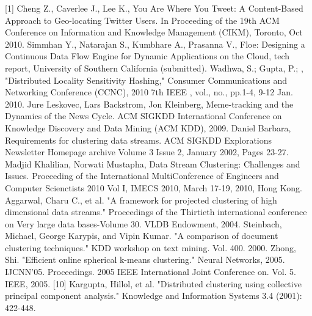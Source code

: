 \documentclass{article} %
\begin{document}
\small{

[1] 	Cheng Z., Caverlee J., Lee K., You Are Where You Tweet: A Content-Based Approach to Geo-locating Twitter Users. In Proceeding of the 19th ACM Conference on Information and Knowledge Management (CIKM), Toronto, Oct 2010. \newline
[2] Simmhan Y., Natarajan S., Kumbhare A., Prasanna V., Floe: Designing a Continuous Data Flow Engine for Dynamic Applications on the Cloud, tech report, University of Southern California (submitted). \newline
[3] Wadhwa, S.; Gupta, P.; , "Distributed Locality Sensitivity Hashing," Consumer Communications and Networking Conference (CCNC), 2010 7th IEEE , vol., no., pp.1-4, 9-12 Jan. 2010. \newline
[4] Jure Leskovec, Lars Backstrom, Jon Kleinberg, Meme-tracking and the Dynamics of the News Cycle. ACM SIGKDD International Conference on Knowledge Discovery and Data Mining (ACM KDD), 2009. \newline
[5] Daniel Barbara, Requirements for clustering data streams. ACM SIGKDD Explorations Newsletter Homepage archive
Volume 3 Issue 2, January 2002, Pages 23-27. \newline
[6] Madjid Khalilian, Norwati Mustapha, Data Stream Clustering: Challenges and Issues. Proceeding of the International MultiConference of Engineers and Computer Scienctists 2010 Vol I, IMECS 2010, March 17-19, 2010, Hong Kong. \newline
[7] Aggarwal, Charu C., et al. "A framework for projected clustering of high dimensional data streams." Proceedings of the Thirtieth international conference on Very large data bases-Volume 30. VLDB Endowment, 2004. \newline
[8] Steinbach, Michael, George Karypis, and Vipin Kumar. "A comparison of document clustering techniques." KDD workshop on text mining. Vol. 400. 2000. \newline
[9] Zhong, Shi. "Efficient online spherical k-means clustering." Neural Networks, 2005. IJCNN'05. Proceedings. 2005 IEEE International Joint Conference on. Vol. 5. IEEE, 2005.
[10] Kargupta, Hillol, et al. "Distributed clustering using collective principal component analysis." Knowledge and Information Systems 3.4 (2001): 422-448.
}
\end{document}
